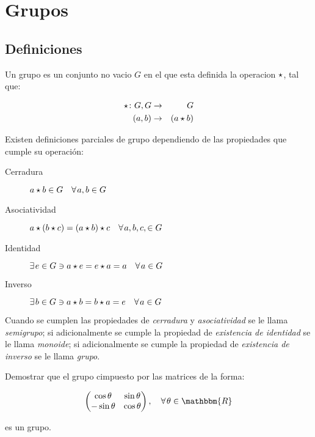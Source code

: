 
\section{Grupos}

    \subsection{Definiciones}

        \begin{definicion}
            Un grupo es un conjunto no vacio $G$ en el que esta definida la operacion $\star$, tal que:

            \begin{eqnarray}
                \star \colon G, G & \to & G \nonumber \\
                (a, b) & \to & (a \star b)
            \end{eqnarray}

            Existen definiciones parciales de grupo dependiendo de las propiedades que cumple su operación:

            \begin{description}
                \item [Cerradura] $a \star b \in G \quad \forall \mkern2mu a, b \in G$
                \item [Asociatividad] $a \star (b \star c) = (a \star b) \star c \quad \forall \mkern2mu a, b, c, \in G$
                \item [Identidad] $\exists\mkern2mu e \in G \ni a \star e = e \star a = a \quad \forall \mkern2mu a \in G$
                \item [Inverso] $\exists\mkern2mu b \in G \ni a \star b = b \star a = e \quad \forall \mkern2mu a \in G$
            \end{description}

            Cuando se cumplen las propiedades de \emph{cerradura} y \emph{asociatividad} se le llama \emph{semigrupo}; si adicionalmente se cumple la propiedad de \emph{existencia de identidad} se le llama \emph{monoide}; si adicionalmente se cumple la propiedad de \emph{existencia de inverso} se le llama \emph{grupo}.
        \end{definicion}

        \begin{ejercicio}
            Demostrar que el grupo cimpuesto por las matrices de la forma:

            \begin{equation*}
                \begin{pmatrix}
                    \cos{\theta} & \sin{\theta} \\
                    -\sin{\theta} & \cos{\theta}
                \end{pmatrix}, \quad \forall\+ \theta \in \mathbbm{R}
            \end{equation*}

            es un grupo.
        \end{ejercicio}

